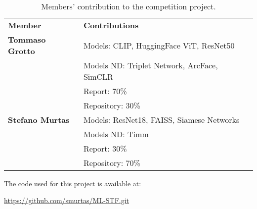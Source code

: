 \documentclass[10pt,twocolumn,letterpaper]{article}
\begin{document}
\begin{table}[ht]
\centering
\caption{Members' contribution to the competition project.}
\begin{tabular}{ll}
\textbf{Member} & \textbf{Contributions} \\
\textbf{Tommaso Grotto} & Models: CLIP, HuggingFace ViT, ResNet50 \\
                        & Models ND: Triplet Network, ArcFace, SimCLR \\
                        & Report: 70\% \\
                        & Repository: 30\% \\
\textbf{Stefano Murtas} & Models: ResNet18, FAISS, Siamese Networks \\
                        & Models ND: Timm \\
                        & Report: 30\% \\
                        & Repository: 70\% \\
\end{tabular}
\end{table}


The code used for this project is available at:

\url{https://github.com/smurtas/ML-STF.git}
\end{document}
